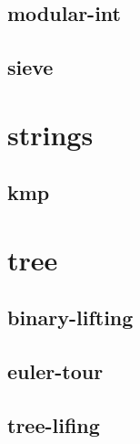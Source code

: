 \documentclass[a4paper, twocolumn]{article}
\begin{document}
\subsection{modular-int}

\subsection{sieve}

\section{strings}
\subsection{kmp}

\section{tree}
\subsection{binary-lifting}

\subsection{euler-tour}

\subsection{tree-lifing}

\end{document}
